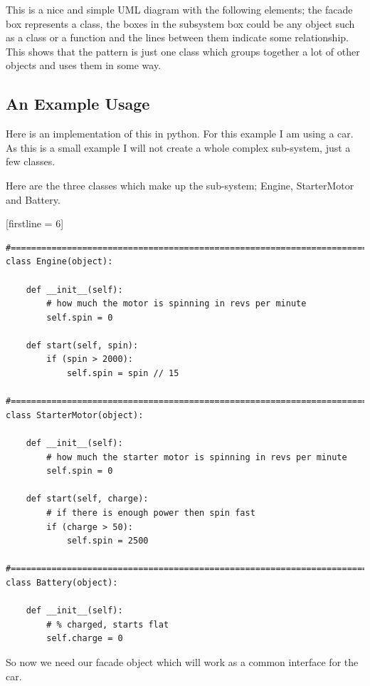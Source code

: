 \documentclass[12pt, oneside]{book} %
\begin{document}
This is a nice and simple UML diagram with the following elements; the facade box represents a class, the boxes in the subsystem box could be any object such as a class or a function and the lines between them indicate some relationship. \\

This shows that the pattern is just one class which groups together a lot of other objects and uses them in some way.

\subsection{An Example Usage}

Here is an implementation of this in python. For this example I am using a car. As this is a small example I will not create a whole complex sub-system, just a few classes.

Here are the three classes which make up the sub-system; Engine, StarterMotor and Battery.

[firstline = 6]
\begin{lstlisting}
#==============================================================================
class Engine(object):
    
    def __init__(self):
        # how much the motor is spinning in revs per minute
        self.spin = 0

    def start(self, spin):
        if (spin > 2000):
            self.spin = spin // 15

#==============================================================================
class StarterMotor(object):
    
    def __init__(self):
        # how much the starter motor is spinning in revs per minute
        self.spin = 0

    def start(self, charge):
        # if there is enough power then spin fast
        if (charge > 50):
            self.spin = 2500

#==============================================================================
class Battery(object):

    def __init__(self):
        # % charged, starts flat
        self.charge = 0
\end{lstlisting}

So now we need our facade object which will work as a common interface for the car.
\end{document}
